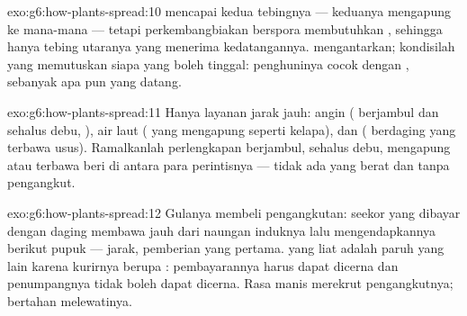 \begin{solution}{exo:g6:how-plants-spread:10}
 mencapai kedua tebingnya --- keduanya mengapung ke mana-mana ---
tetapi perkembangbiakan  berspora membutuhkan ,
sehingga hanya  tebing utaranya yang menerima kedatangannya.
 mengantarkan; kondisilah yang memutuskan siapa yang boleh
tinggal: penghuninya cocok dengan , sebanyak apa pun yang
datang.
\end{solution}

\begin{solution}{exo:g6:how-plants-spread:11}
Hanya layanan jarak jauh: angin ( berjambul dan sehalus debu,
), air laut ( yang mengapung seperti kelapa), dan 
(  berdaging yang terbawa usus). Ramalkanlah perlengkapan
berjambul, sehalus debu, mengapung atau terbawa beri di antara para
perintisnya --- tidak ada  yang berat dan tanpa pengangkut.
\end{solution}

\begin{solution}{exo:g6:how-plants-spread:12}
Gulanya membeli pengangkutan: seekor  yang dibayar dengan daging
membawa  jauh dari naungan induknya lalu mengendapkannya
berikut pupuk --- jarak, pemberian yang pertama.  yang liat
adalah paruh yang lain karena kurirnya berupa :
pembayarannya harus dapat dicerna dan penumpangnya tidak boleh dapat
dicerna. Rasa manis merekrut pengangkutnya;  bertahan
melewatinya.
\end{solution}

